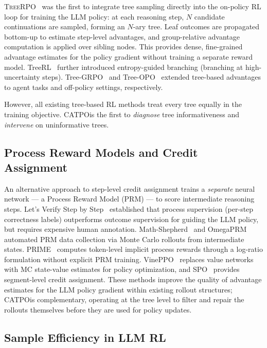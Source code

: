 \documentclass{article} %
\newcommand{\CATPO}{\textsc{CATPO}}
\newcommand{\TreeRPO}{\textsc{TreeRPO}}
\begin{document}
\TreeRPO~\citep{treerpo} was the first to integrate tree sampling directly into the on-policy RL loop for training the LLM policy: at each reasoning step, $N$ candidate continuations are sampled, forming an $N$-ary tree. Leaf outcomes are propagated bottom-up to estimate step-level advantages, and group-relative advantage computation is applied over sibling nodes. This provides dense, fine-grained advantage estimates for the policy gradient without training a separate reward model. TreeRL~\citep{treerl} further introduced entropy-guided branching (branching at high-uncertainty steps). Tree-GRPO~\citep{treegrpo} and Tree-OPO~\citep{treeopo} extended tree-based advantages to agent tasks and off-policy settings, respectively.

However, all existing tree-based RL methods treat every tree equally in the training objective. \CATPO is the first to \emph{diagnose} tree informativeness and \emph{intervene} on uninformative trees.

\subsection{Process Reward Models and Credit Assignment}

An alternative approach to step-level credit assignment trains a \emph{separate} neural network --- a Process Reward Model (PRM) --- to score intermediate reasoning steps. Let's Verify Step by Step~\citep{verify_stepbystep} established that process supervision (per-step correctness labels) outperforms outcome supervision for guiding the LLM policy, but requires expensive human annotation. Math-Shepherd~\citep{mathshepherd} and OmegaPRM~\citep{omegaprm} automated PRM data collection via Monte Carlo rollouts from intermediate states. PRIME~\citep{prime} computes token-level implicit process rewards through a log-ratio formulation without explicit PRM training. VinePPO~\citep{kazemnejad2025vineppo} replaces value networks with MC state-value estimates for policy optimization, and SPO~\citep{spo} provides segment-level credit assignment. These methods improve the quality of advantage estimates for the LLM policy gradient within existing rollout structures; \CATPO is complementary, operating at the tree level to filter and repair the rollouts themselves before they are used for policy updates.

\subsection{Sample Efficiency in LLM RL}
\end{document}
